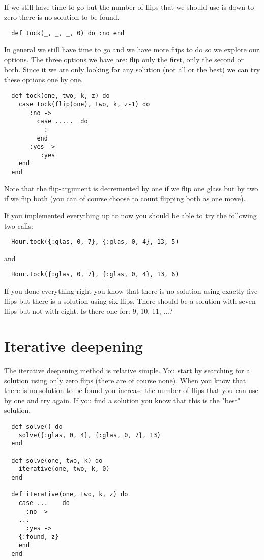 \documentclass[a4paper,11pt]{article}
\begin{document}
If we still have time to go but the number of flips that we should use
is down to zero there is no solution to be found.

\begin{verbatim}
  def tock(_, _, _, 0) do :no end  
\end{verbatim}

In general we still have time to go and we have more flips to do so we
explore our options. The three options we have are: flip only the
first, only the second or both. Since it we are only looking for any
solution (not all or the best) we can try these options one by one. 

\begin{verbatim}
  def tock(one, two, k, z) do
    case tock(flip(one), two, k, z-1) do 
       :no ->
         case .....  do
           :
         end
       :yes ->
          :yes     
    end
  end 
\end{verbatim}

Note that the flip-argument is decremented by one if we flip one glass
but by two if we flip both (you can of course choose to count flipping
both as one move).

If you implemented everything up to now you should be able to try the
following two calls:

\begin{verbatim}
  Hour.tock({:glas, 0, 7}, {:glas, 0, 4}, 13, 5)
\end{verbatim}
and
\begin{verbatim}
  Hour.tock({:glas, 0, 7}, {:glas, 0, 4}, 13, 6)
\end{verbatim}

If you done everything right you know that there is no solution using
exactly five flips but there is a solution using six flips. There
should be a solution with seven flips but not with eight. Is there one
for: 9, 10, 11, ...?

\section*{Iterative deepening}

The iterative deepening method is relative simple. You start by
searching for a solution using only zero flips (there are of course
none). When you know that there is no solution to be found you
increase the number of flips that you can use by one and try again. If
you find a solution you know that this is the "best" solution.


\begin{verbatim}
  def solve() do
    solve({:glas, 0, 4}, {:glas, 0, 7}, 13)
  end
  
  def solve(one, two, k) do
    iterative(one, two, k, 0)
  end
  
  def iterative(one, two, k, z) do
    case ...    do
      :no ->
	...
      :yes ->
	{:found, z}
    end
  end
\end{verbatim}
\end{document}
